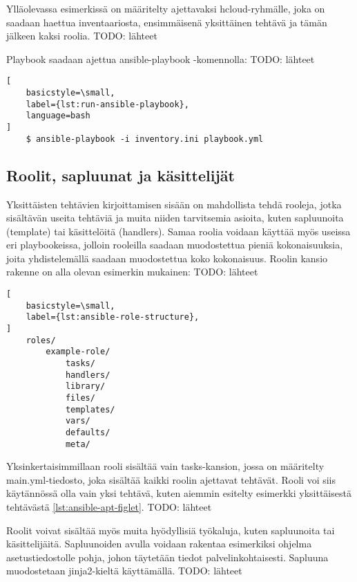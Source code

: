 Ylläolevassa esimerkissä on määritelty ajettavaksi hcloud-ryhmälle, joka
on saadaan haettua inventaariosta, ensimmäisenä yksittäinen tehtävä ja
tämän jälkeen kaksi roolia.
TODO: lähteet

Playbook saadaan ajettua ansible-playbook -komennolla:
TODO: lähteet

\begin{lstlisting}[
    basicstyle=\small,
    label={lst:run-ansible-playbook},
    language=bash
]
    $ ansible-playbook -i inventory.ini playbook.yml
\end{lstlisting}

\subsection{Roolit, sapluunat ja käsittelijät}

Yksittäisten tehtävien kirjoittamisen sisään on mahdollista tehdä rooleja,
jotka sisältävän useita tehtäviä ja muita niiden tarvitsemia asioita, kuten
sapluunoita (template) tai käsittelöitä (handlers). Samaa roolia voidaan
käyttää myös useissa eri playbookeissa, jolloin rooleilla saadaan muodostettua
pieniä kokonaisuuksia, joita yhdistelemällä saadaan muodostettua koko
kokonaisuus. Roolin kansio rakenne on alla olevan esimerkin mukainen:
TODO: lähteet

\begin{lstlisting}[
    basicstyle=\small,
    label={lst:ansible-role-structure},
]
    roles/
        example-role/
            tasks/
            handlers/
            library/
            files/
            templates/
            vars/
            defaults/
            meta/
\end{lstlisting}

Yksinkertaisimmillaan rooli sisältää vain tasks-kansion, jossa on määritelty
main.yml-tiedosto, joka sisältää kaikki roolin ajettavat tehtävät. Rooli
voi siis käytännössä olla vain yksi tehtävä, kuten aiemmin esitelty esimerkki
yksittäisestä tehtävästä \ref{lst:ansible-apt-figlet}.
TODO: lähteet

Roolit voivat sisältää myös muita hyödyllisiä työkaluja, kuten sapluunoita tai
käsittelijäitä. Sapluunoiden avulla voidaan rakentaa esimerkiksi ohjelma
asetustiedostolle pohja, johon täytetään tiedot palvelinkohtaisesti. Sapluuna
muodostetaan jinja2-kieltä käyttämällä.
TODO: lähteet




